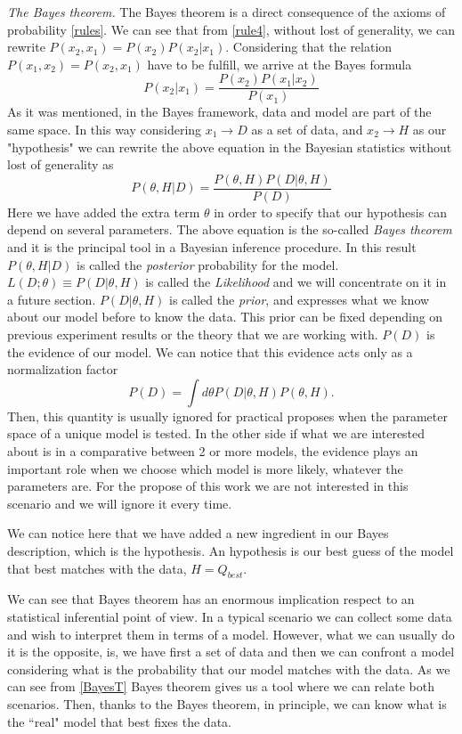 \documentclass[onecolumn,           %
               showpacs,            %
               preprintnumbers,     %
               aps,                 %
               prl,          	    %
               letterpaper,             %
               superscriptaddress,      %
               nofootinbib,         %
               tightenlines,        %
               floats,floatfix      %
               ,usenatbib,
               ]{revtex4-1}
\begin{document}
\textit{The Bayes theorem.} The Bayes theorem is a direct consequence of the axioms of probability \eqref{rules}. We can see that from \eqref{rule4}, without lost of generality, we can rewrite $P(x_2,x_1)=P(x_2)P(x_2|x_1)$. Considering that the relation $P(x_1,x_2)=P(x_2,x_1)$ have to be fulfill, we arrive at the Bayes formula   
\begin{equation}
P(x_2|x_1)=\frac{P(x_2)P(x_1|x_2)}{P(x_1)}
\end{equation}
As it was mentioned, in the Bayes framework, data and model are part of the same space. In this way considering $x_1\rightarrow D$ as a set of data, and $x_2\rightarrow H$ as our "hypothesis" we can rewrite the above equation in the Bayesian statistics without lost of generality as
\begin{equation}\label{BayesT}
P(\theta,H|D)=\frac{P(\theta,H)P(D|\theta,H)}{P(D)}
\end{equation}
Here we have added the extra term $\theta$ in order to specify that our hypothesis can depend on several parameters. 
The above equation is the so-called \textit{Bayes theorem} and it is the principal tool in a Bayesian inference procedure. In this result $P(\theta,H|D)$ is called the \textit{posterior} probability for the model. $L(D;\theta)\equiv P(D|\theta,H)$ is called the \textit{Likelihood} and we will concentrate on it in a future section. $P(D|\theta,H)$ is called the \textit{prior}, and expresses what we know about our model before to know the data. This prior can be fixed depending on previous experiment results or the theory that we are working with. $P(D)$ is the evidence of our model. We can notice that this evidence acts only as a normalization factor
\begin{equation}\label{PD}
P(D)=\int d\theta P(D|\theta,H)P(\theta,H).
\end{equation}
Then, this quantity is usually ignored for practical proposes when the parameter space of a unique model is tested. In the other side if what we are interested about is in a comparative between 2 or more models, the evidence plays an important role when we choose which model is more likely, whatever the parameters are. For the propose of this work we are not interested in this scenario and we will ignore it every time.

We can notice here that we have added a new ingredient in our Bayes description, which is the hypothesis. An hypothesis is our best guess of the model that best matches with the data, $H=Q_{best}$.

We can see that Bayes theorem has an enormous implication respect to an statistical inferential point of view. In a typical scenario we can collect some data and wish to interpret them in terms of a model. However, what we can usually do it is the opposite, is, we have first a set of data and then we can confront a model considering what is the probability that our model matches with the data. As we can see from \eqref{BayesT} Bayes theorem gives us a tool where we can relate both scenarios. Then, thanks to the Bayes theorem, in principle, we can know what is the ``real" model that best fixes the data. 
\end{document}
